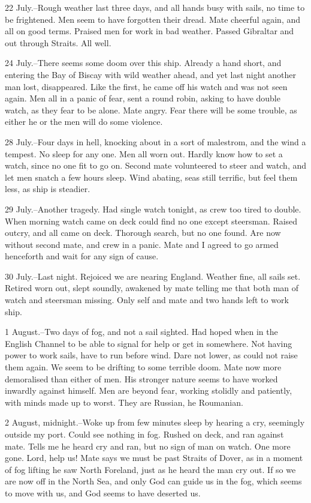 22 July.--Rough weather last three days, and all hands busy with sails, no time to be frightened. Men seem to have forgotten their dread. Mate cheerful again, and all on good terms. Praised men for work in bad weather. Passed Gibraltar and out through Straits. All well. 

24 July.--There seems some doom over this ship. Already a hand short, and entering the Bay of Biscay with wild weather ahead, and yet last night another man lost, disappeared. Like the first, he came off his watch and was not seen again. Men all in a panic of fear, sent a round robin, asking to have double watch, as they fear to be alone. Mate angry. Fear there will be some trouble, as either he or the men will do some violence. 

28 July.--Four days in hell, knocking about in a sort of malestrom, and the wind a tempest. No sleep for any one. Men all worn out. Hardly know how to set a watch, since no one fit to go on. Second mate volunteered to steer and watch, and let men snatch a few hours sleep. Wind abating, seas still terrific, but feel them less, as ship is steadier. 

29 July.--Another tragedy. Had single watch tonight, as crew too tired to double. When morning watch came on deck could find no one except steersman. Raised outcry, and all came on deck. Thorough search, but no one found. Are now without second mate, and crew in a panic. Mate and I agreed to go armed henceforth and wait for any sign of cause. 

30 July.--Last night. Rejoiced we are nearing England. Weather fine, all sails set. Retired worn out, slept soundly, awakened by mate telling me that both man of watch and steersman missing. Only self and mate and two hands left to work ship. 

1 August.--Two days of fog, and not a sail sighted. Had hoped when in the English Channel to be able to signal for help or get in somewhere. Not having power to work sails, have to run before wind. Dare not lower, as could not raise them again. We seem to be drifting to some terrible doom. Mate now more demoralised than either of men. His stronger nature seems to have worked inwardly against himself. Men are beyond fear, working stolidly and patiently, with minds made up to worst. They are Russian, he Roumanian. 

2 August, midnight.--Woke up from few minutes sleep by hearing a cry, seemingly outside my port. Could see nothing in fog. Rushed on deck, and ran against mate. Tells me he heard cry and ran, but no sign of man on watch. One more gone. Lord, help us! Mate says we must be past Straits of Dover, as in a moment of fog lifting he saw North Foreland, just as he heard the man cry out. If so we are now off in the North Sea, and only God can guide us in the fog, which seems to move with us, and God seems to have deserted us. 

